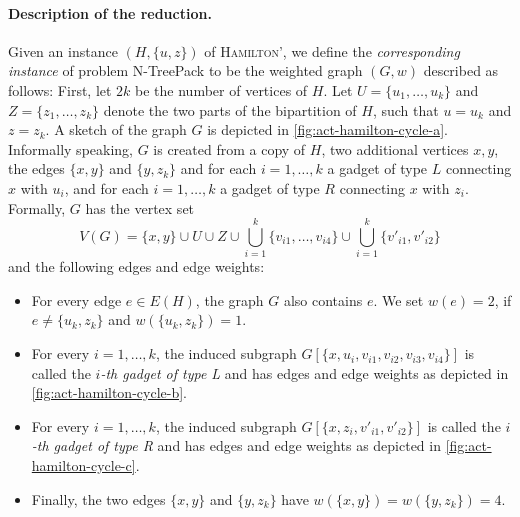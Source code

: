 \documentclass[runningheads]{llncs}
\newcommand{\set}[1]{\{ #1 \}}
\newcommand{\fromto}[2]{\set{#1, \ldots, #2}}
\newcommand{\xxxNTP}{{\sc N-TreePack}}
\begin{document}
\paragraph{Description of the reduction.} Given an instance $(H, \set{u,z})$ of \textsc{Hamilton'}, we define the \emph{corresponding instance} of problem {\xxxNTP} to be the weighted graph $(G, w)$ described as follows: First, let $2k$ be the number of vertices of $H$. Let $U = \fromto{u_1}{u_k}$ and $Z = \fromto{z_1}{z_k}$ denote the two parts of the bipartition of $H$, such that $u = u_k$ and $z = z_k$. A sketch of the graph $G$ is depicted in \cref{fig:act-hamilton-cycle-a}. Informally speaking, $G$ is created from a copy of $H$, two additional vertices $x, y$, the edges $\set{x,y}$ and $\set{y, z_k}$ and for each $i = 1,\dots, k$ a gadget of type $L$ connecting $x$ with $u_i$, and for each $i = 1,\dots, k$ a gadget of type $R$ connecting $x$ with $z_i$. Formally, $G$ has the vertex set 
\[ V(G) = \set{x, y} \cup U \cup Z \cup \bigcup_{i=1}^k \fromto{v_{i1}}{v_{i4}} \cup \bigcup_{i=1}^k \set{v'_{i1}, v'_{i2}} \]
and the following edges and edge weights:
\begin{itemize}
\item For every edge $e \in E(H)$, the graph $G$ also contains $e$. We set $w(e) = 2$, if $e \neq \set{u_k, z_k}$ and $w(\set{u_k, z_k}) = 1$.
\item For every $i = 1,\dots,k$, the induced subgraph $G[\set{x, u_i, v_{i1}, v_{i2}, v_{i3}, v_{i4}}]$ is called the \emph{$i$-th gadget of type L} and has edges and edge weights as depicted in \cref{fig:act-hamilton-cycle-b}.
\item For every $i = 1,\dots,k$, the induced subgraph $G[\set{x, z_i, v'_{i1}, v'_{i2}}]$ is called the \emph{$i$-th gadget of type R} and has edges and edge weights as depicted in \cref{fig:act-hamilton-cycle-c}.
\item Finally, the two edges $\set{x,y}$ and $\set{y, z_k}$ have $w(\set{x,y}) = w(\set{y, z_k}) = 4$.
\end{itemize}
\end{document}
